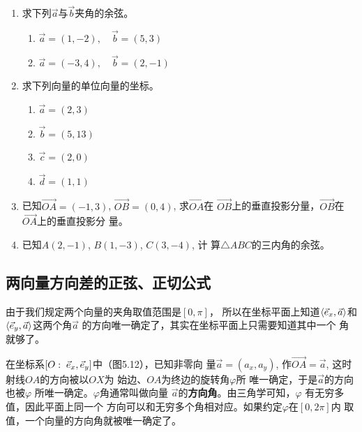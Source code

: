 \begin{ex}
\begin{enumerate}
    \item 求下列$\vec{a}$与$\vec{b}$夹角的余弦。
\begin{enumerate}
    \item $\vec{a}=(1,-2),\quad \vec{b}=(5,3)$
    \item $\vec{a}=(-3,4),\quad \vec{b}=(2,-1)$
\end{enumerate}  
    \item 求下列向量的单位向量的坐标。
\begin{multicols}{2}
\begin{enumerate}
    \item $\vec{a}=(2,3)$
    \item $\vec{b}=(5,13)$
    \item $\vec{c}=(2,0)$
    \item $\vec{d}=(1,1)$
\end{enumerate}
\end{multicols}
    \item 已知$\Vec{OA}=(-1,3)$, 
    $\Vec{OB}=(0,4)$, 求$\Vec{OA}$在
    $\Vec{OB}$上的垂直投影分量，$\Vec{OB}$在$\Vec{OA}$上的垂直投影分
    量。
    \item 已知$A(2,-1)$, $B(1,-3)$, $C(3,-4)$, 计
    算$\triangle ABC$的三内角的余弦。
\end{enumerate} 
\end{ex}

\subsection{两向量方向差的正弦、正切公式}
由于我们规定两个向量的夹角取值范围是$[0,\pi]$，
所以在坐标平面上知道$\left\langle \vec{e}_x,\vec{a} \right\rangle$和$\left\langle \vec{e}_y,\vec{a} \right\rangle$这两个角$\vec{a}$
的方向唯一确定了，其实在坐标平面上只需要知道其中一个
角就够了。

在坐标系$[O:\; \vec{e}_x,\vec{e}_y]$中（图5.12），已知非零向
量$\vec{a}=(a_x,a_y)$, 作$\Vec{OA}=\vec{a}$, 
这时射线$OA$的方向被以$OX$为
始边、$OA$为终边的旋转角$\varphi$所
唯一确定，于是$\vec{a}$的方向也被$\varphi$
所唯一确定。$\varphi$角通常叫做向量
$\vec{a}$的\textbf{方向角}。由三角学可知，$\varphi$
有无穷多值，因此平面上同一个
方向可以和无穷多个角相对应。如果约定$\varphi$在$[0,2\pi]$内
取值，一个向量的方向角就被唯一确定了。

\begin{figure}[htp]
    \centering
    \caption{}
\end{figure}

